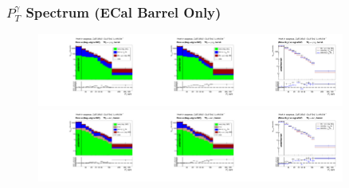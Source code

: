 \begin{frame}\frametitle{\footnotesize{$P_T^{\gamma}$ Spectrum (ECal Barrel Only)}}
   \begin{figure}[htb]
    \begin{center}
       \includegraphics[width=0.30\textwidth]{../figs/figs_v11/MUON_WGamma/PrepareYields/c_DATAvsBkgPlusSigMCc_MUON_WGamma_TEMPL_CHISO_UNblind__Barrel__phoEt.pdf}\includegraphics[width=0.30\textwidth]{../figs/figs_v11/MUON_WGamma/PrepareYields/c_DATAvsBkgPlusSigMCc_MUON_WGamma_TEMPL_SIHIH_UNblind__Barrel__phoEt.pdf}\includegraphics[width=0.30\textwidth]{../figs/figs_v11/MUON_WGamma/PrepareYields/c_BkgSubtrDATAvsSIGMC_c_MUON_WGamma__UNblind__Barrel__phoEt.pdf}\\
       \includegraphics[width=0.30\textwidth]{../figs/figs_v11/ELECTRON_WGamma/PrepareYields/c_DATAvsBkgPlusSigMCc_ELECTRON_WGamma_TEMPL_CHISO_UNblind__Barrel__phoEt.pdf}\includegraphics[width=0.30\textwidth]{../figs/figs_v11/ELECTRON_WGamma/PrepareYields/c_DATAvsBkgPlusSigMCc_ELECTRON_WGamma_TEMPL_SIHIH_UNblind__Barrel__phoEt.pdf}\includegraphics[width=0.30\textwidth]{../figs/figs_v11/ELECTRON_WGamma/PrepareYields/c_BkgSubtrDATAvsSIGMC_c_ELECTRON_WGamma__UNblind__Barrel__phoEt.pdf}\\

\end{center}
\end{figure}
\end{frame}
